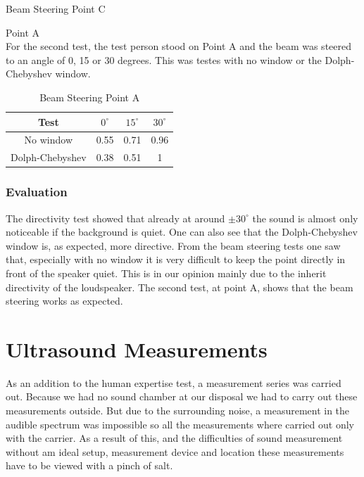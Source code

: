 \begin{enumerate}
\begin{center}
\begin{table}[h!]
    \caption{Beam Steering Point C}
    \label{6.1.3_tab:music_audio_volume_steering_c}
    \end{table}   
    \end{center}
     \subitem Point A\\
    For the second test, the test person stood on Point A and the beam was steered to an angle of 0, 15 or 30 degrees. This was testes with no window or the Dolph-Chebyshev window.
    \begin{center}
     \begin{table}[h!]
    \centering
    \begin{tabular}{ |c|c|c|c|}
      \hline 
      Test & $0^\circ$ & $15^\circ$ & $30^\circ$ \\ 
      \hline
     No window & 0.55 & 0.71 & 0.96 \\
     \hline
     Dolph-Chebyshev & 0.38 & 0.51 & 1 \\
     \hline
    \end{tabular}
    \caption{Beam Steering Point A}
    \label{6.1.3_tab:music_audio_volume_steering_A}
    \end{table}   
    \end{center}
\end{enumerate}
\subsubsection{Evaluation}
The directivity test showed that already at around $\pm 30^\circ$ the sound is almost only noticeable if the background is quiet. One can also see that the Dolph-Chebyshev window is, as expected, more directive. From the beam steering tests one saw that, especially with no window it is very difficult to keep the point directly in front of the speaker quiet. This is in our opinion mainly due to the inherit directivity of the loudspeaker. The second test, at point A, shows that the beam steering works as expected.
\newpage

\section{Ultrasound Measurements}\label{6_sec:ultrasonic}
As an addition to the human expertise test, a measurement series was carried out. Because we had no sound chamber at our disposal we had to carry out these measurements outside. But due to the surrounding noise, a measurement in the audible spectrum was impossible so all the measurements where carried out only with the carrier. As a result of this, and the difficulties of sound measurement without am ideal setup, measurement device and location these measurements have to be viewed with a pinch of salt.
